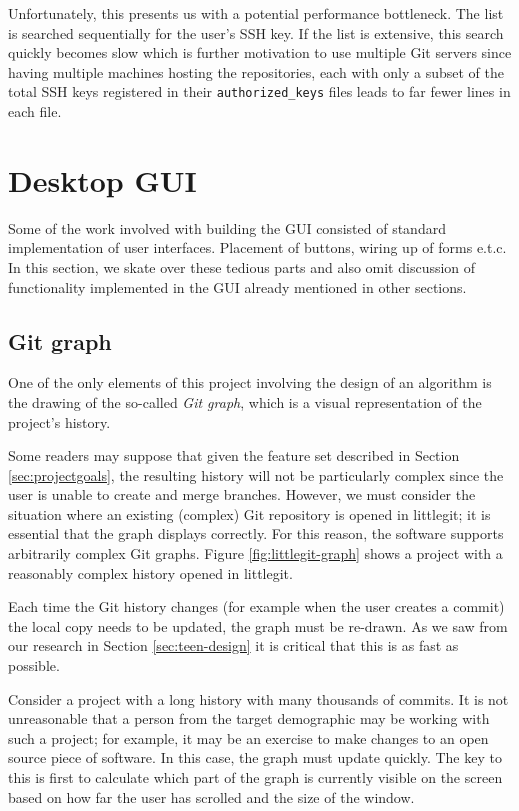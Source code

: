 Unfortunately, this presents us with a potential performance bottleneck. The list is searched sequentially for the user's SSH key. If the list is extensive, this search quickly becomes slow which is further motivation to use multiple Git servers since having multiple machines hosting the repositories, each with only a subset of the total SSH keys registered in their \texttt{authorized\_keys} files leads to far fewer lines in each file. 

\section{Desktop GUI}

Some of the work involved with building the GUI consisted of standard implementation of user interfaces. Placement of buttons, wiring up of forms e.t.c. In this section, we skate over these tedious parts and also omit discussion of functionality implemented in the GUI already mentioned in other sections.

\subsection{Git graph}

One of the only elements of this project involving the design of an algorithm is the drawing of the so-called \emph{Git graph}, which is a visual representation of the project's history.

Some readers may suppose that given the feature set described in Section \ref{sec:projectgoals}, the resulting history will not be particularly complex since the user is unable to create and merge branches. However, we must consider the situation where an existing (complex) Git repository is opened in littlegit; it is essential that the graph displays correctly. For this reason, the software supports arbitrarily complex Git graphs. Figure \ref{fig:littlegit-graph} shows a project with a reasonably complex history opened in littlegit.


Each time the Git history changes (for example when the user creates a commit) the local copy needs to be updated, the graph must be re-drawn. As we saw from our research in Section \ref{sec:teen-design} it is critical that this is as fast as possible. 

Consider a project with a long history with many thousands of commits. It is not unreasonable that a person from the target demographic may be working with such a project; for example, it may be an exercise to make changes to an open source piece of software. In this case, the graph must update quickly. The key to this is first to calculate which part of the graph is currently visible on the screen based on how far the user has scrolled and the size of the window.

